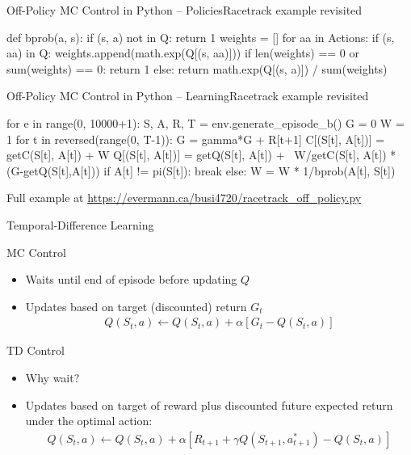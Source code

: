 \documentclass[ignorenonframetext,xcolor=x11names]{beamer}
\begin{document}
\begin{frame}[fragile]{Off-Policy MC Control in Python -- Policies}{Racetrack example revisited}
\begin{pythoncode}
def bprob(a, s):
    if (s, a) not in Q:
        return 1
    weights = []
    for aa in Actions:
        if (s, aa) in Q:
            weights.append(math.exp(Q[(s, aa)]))
    if len(weights) == 0 or sum(weights) == 0:
        return 1
    else:
        return math.exp(Q[(s, a)]) / sum(weights)
\end{pythoncode}
\end{frame}



\begin{frame}[fragile]{Off-Policy MC Control in Python -- Learning}{Racetrack example revisited}
\begin{pythoncode}
for e in range(0, 10000+1):
    S, A, R, T = env.generate_episode_b()
    G = 0
    W = 1
    for t in reversed(range(0, T-1)):
        G = gamma*G + R[t+1]
        C[(S[t], A[t])] = getC(S[t], A[t]) + W
        Q[(S[t], A[t])] = getQ(S[t], A[t]) + \
               W/getC(S[t], A[t]) * (G-getQ(S[t],A[t]))
        if A[t] != pi(S[t]):
            break
        else:
            W = W * 1/bprob(A[t], S[t])
\end{pythoncode}
\footnotesize

Full example at \url{https://evermann.ca/busi4720/racetrack_off_policy.py}
\end{frame}

\begin{frame}{Temporal-Difference Learning}
\begin{block}{MC Control}
\begin{itemize}
   \item Waits until end of episode before updating $Q$
   \item Updates based on target (discounted) return $G_t$ 
   \begin{align*}
   Q(S_t, a) \leftarrow Q(S_t, a) + \alpha \left[ G_t - Q(S_t, a) \right]
   \end{align*}
\end{itemize}
\end{block}

\begin{block}{TD Control}
\begin{itemize}
   \item Why wait?
   \item Updates based on target of reward plus discounted future expected return under the optimal action:
   \begin{align*}
   Q(S_t, a) \leftarrow Q(S_t, a) + \alpha \left[ R_{t+1} + \gamma Q(S_{t+1}, a_{t+1}^*) - Q(S_t, a) \right]
   \end{align*}
\end{itemize}
\end{block}
\end{frame}
\end{document}

